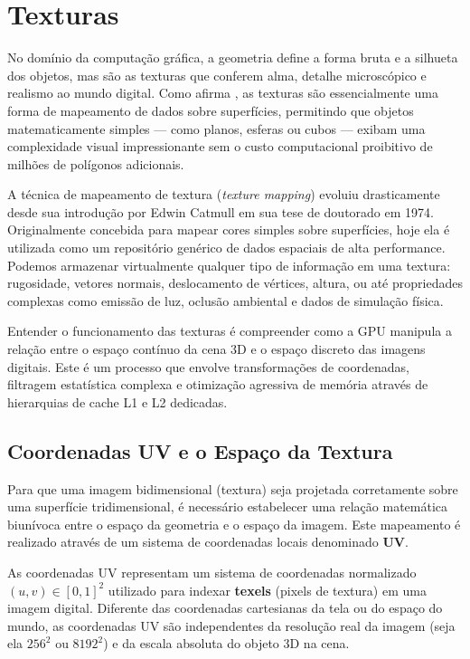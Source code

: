 \chapter{Texturas}

No domínio da computação gráfica, a geometria define a forma bruta e a silhueta dos objetos, mas são as texturas que conferem alma, detalhe microscópico e realismo ao mundo digital. 
Como afirma \textcite{shirley2021fundamentals}, as texturas são essencialmente uma forma de mapeamento de dados sobre superfícies, permitindo que objetos matematicamente simples — como planos, esferas ou cubos — exibam uma complexidade visual impressionante sem o custo computacional proibitivo de milhões de polígonos adicionais.

A técnica de mapeamento de textura (\textit{texture mapping}) evoluiu drasticamente desde sua introdução por Edwin Catmull em sua tese de doutorado em 1974. 
Originalmente concebida para mapear cores simples sobre superfícies, hoje ela é utilizada como um repositório genérico de dados espaciais de alta performance. 
Podemos armazenar virtualmente qualquer tipo de informação em uma textura: rugosidade, vetores normais, deslocamento de vértices, altura, ou até propriedades complexas como emissão de luz, oclusão ambiental e dados de simulação física. 

Entender o funcionamento das texturas é compreender como a GPU manipula a relação entre o espaço contínuo da cena 3D e o espaço discreto das imagens digitais. 
Este é um processo que envolve transformações de coordenadas, filtragem estatística complexa e otimização agressiva de memória através de hierarquias de cache L1 e L2 dedicadas.

\section{Coordenadas UV e o Espaço da Textura}

Para que uma imagem bidimensional (textura) seja projetada corretamente sobre uma superfície tridimensional, é necessário estabelecer uma relação matemática biunívoca entre o espaço da geometria e o espaço da imagem. 
Este mapeamento é realizado através de um sistema de coordenadas locais denominado \textbf{UV}.

\begin{tcolorbox}[colback=devcafe-light, colframe=devcafe-blue, title={\faBook\ Definição: Coordenadas UV}, fonttitle=\bfseries]
    As coordenadas UV representam um sistema de coordenadas normalizado $(u,v) \in [0,1]^2$ utilizado para indexar \textbf{texels} (pixels de textura) em uma imagem digital. 
    Diferente das coordenadas cartesianas da tela ou do espaço do mundo, as coordenadas UV são independentes da resolução real da imagem (seja ela $256^2$ ou $8192^2$) e da escala absoluta do objeto 3D na cena.
\end{tcolorbox}

